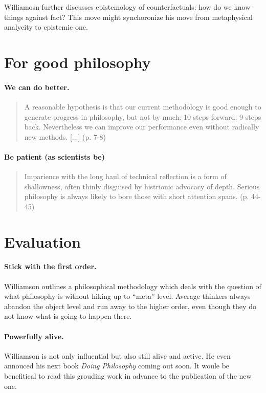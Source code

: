 \documentclass[
10pt, %
a4paper, %
twocolumn, %
landscape %
]{article}
\begin{document}
Williamosn further discusses epistemology of counterfactuals: how do we know things against fact? 
This move might synchoronize his move from metaphysical analycity to epistemic one. 

\section*{For good philosophy}
\paragraph{We can do better.}
\begin{quotation}
\noindent A reasonable hypothesis is that our current methodology is good enough to generate progress in philosophy, but not by much: 10 steps forward, 9 steps back. Nevertheless we can improve our performance even without radically new methods. [...]
(p. 7-8)
\end{quotation}

\paragraph{Be patient (as scientists be)}
\begin{quotation}
\noindent [...] Imparience with the long haul of technical reflection is a form of shallowness, often thinly disguised by histrionic advocacy of depth. 
Serious philosophy is always likely to bore those with short attention spans. (p. 44-45)
\end{quotation}

\section*{Evaluation}
\paragraph{Stick with the first order.}
Williamson outlines a philosophical methodology which deals with the question of what philosophy is without hiking up to ``meta'' level. 
Average thinkers always abandon the object level and run away to the higher order, even though they do not know what is going to happen there. 

\paragraph{Powerfully alive.}
Williamson is not only influential but also still alive and active. He even annouced his next book \textit{Doing Philosophy} coming out soon. 
It woule be benefitical to read this grouding work in advance to the publication of the new one. 

\renewcommand{\refname}{Reference} %


\end{document}

